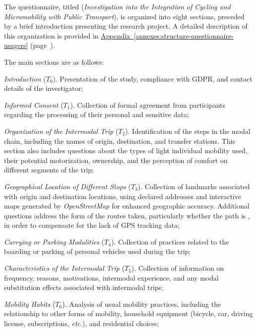 \begin{refsegment}
The questionnaire, titled  (\textsl{Investigation into the Integration of Cycling and Micromobility with Public Transport}), is organized into eight sections, preceded by a brief introduction presenting the research project. A detailed description of this organization is provided in \hyperref[annexes:structure-questionnaire-usagers]{Appendix~\ref{annexes:structure-questionnaire-usagers}} (page~\pageref{annexes:structure-questionnaire-usagers}).%

The main sections are as follows:
\begin{customitemize}
    \item \textsl{Introduction} (\(T_{0}\)). Presentation of the study, compliance with \acrshort{GDPR}, and contact details of the investigator;
    \item \textsl{Informed Consent} (\(T_{1}\)). Collection of formal agreement from participants regarding the processing of their personal and sensitive data;
    \item \textsl{Organization of the Intermodal Trip} (\(T_{2}\)). Identification of the steps in the modal chain, including the names of origin, destination, and transfer stations. This section also includes questions about the types of light individual mobility used, their potential motorization, ownership, and the perception of comfort on different segments of the trip;
    \item \textsl{Geographical Location of Different Stops} (\(T_{3}\)). Collection of landmarks associated with origin and destination locations, using declared addresses and interactive maps generated by \textsl{OpenStreetMap} for enhanced geographic accuracy. Additional questions address the form of the routes taken, particularly whether the path is , in order to compensate for the lack of GPS tracking data;
    \item \textsl{Carrying or Parking Modalities} (\(T_{4}\)). Collection of practices related to the boarding or parking of personal vehicles used during the trip;
    \item \textsl{Characteristics of the Intermodal Trip} (\(T_{5}\)). Collection of information on frequency, reasons, motivations, intermodal experience, and any modal substitution effects associated with intermodal trips;
    \item \textsl{Mobility Habits} (\(T_{6}\)). Analysis of usual mobility practices, including the relationship to other forms of mobility, household equipment (bicycle, car, driving license, subscriptions, \textsl{etc.}), and residential choices;

\end{customitemize}
\end{refsegment}
